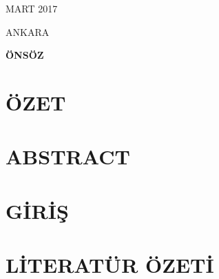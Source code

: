 \documentclass[11pt]{article}
\begin{document}
\bigskip





\begin{center}
{\Large MART 2017

\vspace{1mm}
ANKARA}
\end{center}


\linespread{1.5}

\newpage\setlength{\parskip}{3mm} 
\onehalfspacing
\bigskip
{}
\setcounter{page}{1}

\begin{center}

  
{\LARGE \bf ÖNSÖZ}
\end{center}


\newpage

\setlength{\parskip}{1mm} 

\tableofcontents
\listoffigures
\listoftables



\newpage \setlength{\parskip}{3mm}
\phantom{ss}
\vspace{-2.5cm}
\sectionfont{\centering}

\section*{ÖZET}



\newpage
\section*{ABSTRACT}


\newpage


\renewcommand{\thesection}{\arabic{section}.}

\setcounter{page}{1}


\section{GİRİŞ}



\clearpage
\section {LİTERATÜR ÖZETİ}
\end{document}
